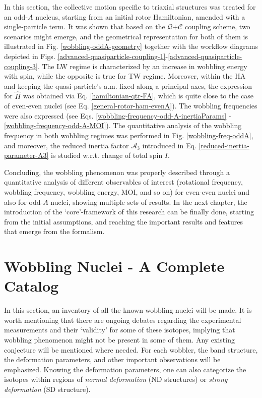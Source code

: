 In this section, the collective motion specific to triaxial structures was treated for an odd-$A$ nucleus, starting from an initial rotor Hamiltonian, amended with a single-particle term. It was shown that based on the $\mathcal{Q}$+$\mathscr{C}$ coupling scheme, two scenarios might emerge, and the geometrical representation for both of them is illustrated in Fig. \ref{wobbling-oddA-geometry} together with the workflow diagrams depicted in Figs. \ref{advanced-quasiparticle-coupling-1}-\ref{advanced-quasiparticle-coupling-3}. The LW regime is characterized by an increase in wobbling energy with spin, while the opposite is true for TW regime. Moreover, within the HA and keeping the quasi-particle's a.m. fixed along a principal axes, the expression for $\hat{H}$ was obtained via Eq. \ref{hamiltonian-qtr-FA}, which is quite close to the case of even-even nuclei (see Eq. \ref{general-rotor-ham-evenA}). The wobbling frequencies were also expressed (see Eqs. \ref{wobbling-frequency-odd-A-inertiaParams} - \ref{wobbling-frequency-odd-A-MOI}). The quantitative analysis of the wobbling frequency in both wobbling regimes was performed in Fig. \ref{wobbling-freq-oddA}, and moreover, the reduced inertia factor $\mathscr{A}_3$ introduced in Eq. \ref{reduced-inertia-parameter-A3} is studied w.r.t. change of total spin $I$.

Concluding, the wobbling phenomenon was properly described through a quantitative analysis of different observables of interest (rotational frequency, wobbling frequency, wobbling energy, MOI, and so on) for even-even nuclei and also for odd-$A$ nuclei, showing multiple sets of results. In the next chapter, the introduction of the `core'-framework of this research can be finally done, starting from the initial assumptions, and reaching the important results and features that emerge from the formalism.

\section{Wobbling Nuclei - A Complete Catalog}

In this section, an inventory of all the known wobbling nuclei will be made. It is worth mentioning that there are ongoing debates regarding the experimental measurements and their `validity' for some of these isotopes, implying that wobbling phenomenon might not be present in some of them. Any existing conjecture will be mentioned where needed. For each wobbler, the band structure, the deformation parameters, and other important observations will be emphasized. Knowing the deformation parameters, one can also categorize the isotopes within regions of \emph{normal deformation} (ND structures) or \emph{strong deformation} (SD structure).

